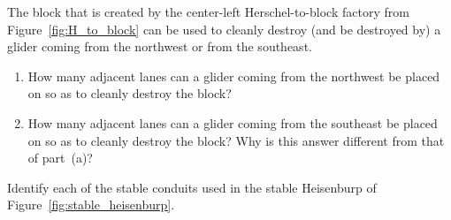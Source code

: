 \begin{multicols}{2}
	
	
	
	
	\mfilbreak
	
	
	\begin{problem}\label{exer:block_factory_block_gliders} 
		The block that is created by the center-left Herschel-to-block factory from Figure~\ref{fig:H_to_block} can be used to cleanly destroy (and be destroyed by) a glider coming from the northwest or from the southeast.
		
		\begin{enumerate}[label=\bf\color{ocre}(\alph*)]
			\item How many adjacent lanes can a glider coming from the northwest be placed on so as to cleanly destroy the block?
			
			\item How many adjacent lanes can a glider coming from the southeast be placed on so as to cleanly destroy the block? Why is this answer different from that of part~(a)?
		\end{enumerate}
	\end{problem}


	\mfilbreak
	
	
	\begin{problemstar}\label{exer:stable_heisenburp_break_apart} 
		Identify each of the stable conduits used in the stable Heisenburp of Figure~\ref{fig:stable_heisenburp}.
		
	\end{problemstar}



\end{multicols}
